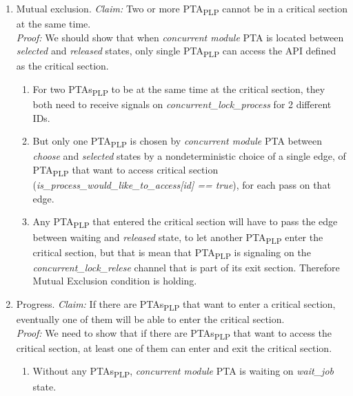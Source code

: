 \begin{enumerate} 
\item Mutual exclusion. \newline
\textit{Claim:} Two or more PTA\textsubscript{PLP} cannot be in a critical section at the same time.\\
\textit{Proof:} We should show that when \textit{concurrent module} PTA is located between \textcolor{ColorUppaalState}{\textit{selected}} and \textcolor{ColorUppaalState}{\textit{released}} states, only single PTA\textsubscript{PLP} can access the API defined as the critical section.
\begin{enumerate} 
\item For two PTAs\textsubscript{PLP} to be at the same time at the critical section, they both need to receive signals on \textcolor{ColorUppaalChannel}{\textit{concurrent_lock_process}} for 2 different IDs.  
\item But only one PTA\textsubscript{PLP} is chosen by \textit{concurrent module} PTA between \textcolor{ColorUppaalState}{\textit{choose}} and \textcolor{ColorUppaalState}{\textit{selected}} states by a nondeterministic choice of a single edge, of PTA\textsubscript{PLP} that want to access critical section (\textcolor{ColorEdgeGuard}{\textit{is_process_would_like_to_access[id] == true}}), for each pass on that edge. 
\item Any PTA\textsubscript{PLP} that entered the critical section will have to pass the edge between waiting and \textcolor{ColorUppaalState}{\textit{released}} state, to let another PTA\textsubscript{PLP} enter the critical section, but that is mean that PTA\textsubscript{PLP} is signaling on the \textcolor{ColorUppaalChannel}{\textit{concurrent_lock_relese}} channel that is part of its exit section. Therefore Mutual Exclusion condition is holding.
\end{enumerate} 
\item Progress. \newline
\textit{Claim:} If there are PTAs\textsubscript{PLP} that want to enter a critical section, eventually one of them will be able to enter the critical section. \\
\textit{Proof:} We need to show that if there are PTAs\textsubscript{PLP} that want to access the critical section, at least one of them can enter and exit the critical section.
\begin{enumerate} 
\item Without any PTAs\textsubscript{PLP}, \textit{concurrent module} PTA is waiting on \textcolor{ColorUppaalState}{\textit{wait_job}} state. 

\end{enumerate}
\end{enumerate}
